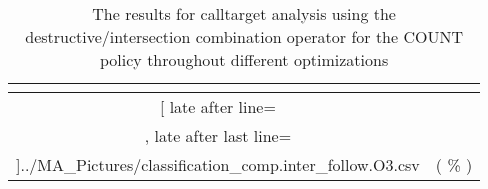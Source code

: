 \begin{table}[!htbp]
{\begin{tabular}{|c|c}
\multicolumn{1}{c}{}
	\\\midrule
	\csvreader[ late after line=\\, late after last line=\\\bottomrule]{../MA_Pictures/classification_comp.inter_follow.O3.csv}{
}
	{\csvcolxiii ( \csvcolxiv \% ) & \csvcolxv ( \csvcolxvi \% )}%


    	\end{tabular}
}
		\caption {The results for calltarget analysis using the destructive/intersection combination operator for the COUNT policy throughout different optimizations}
		\label{tbl:CTdestinterCOUNT}
\end{table}



